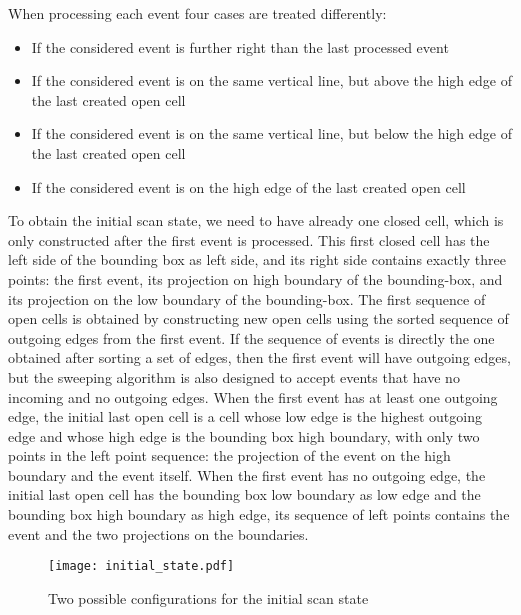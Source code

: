 \documentclass[a4paper, USenglish, cleveref, autoref, thm-restate]{lipics-v2021}
\begin{document}
When processing each event four cases are treated differently:
\begin{itemize}
\item If the considered event is further right than the last processed event
\item If the considered event is on the same vertical line, but above the
high edge of the last created open cell
\item If the considered event is on the same vertical line, but below the
high edge of the last created open cell
\item If the considered event is on the high edge of the last created open cell
\end{itemize}

To obtain the initial scan state, we need to have already one closed
cell, which is only constructed after the first event is processed.
This first closed cell has the left side of the bounding box as left
side, and its right side contains exactly three points: the first
event, its projection on high boundary of the bounding-box, and its
projection on the low boundary of the bounding-box.  The first
sequence of open cells is obtained by constructing new open cells
using the sorted sequence of outgoing edges from the first event.  If
the sequence of events is directly the one obtained after sorting a
set of edges, then the first event will have outgoing edges, but the
sweeping algorithm is also designed to accept events that have no
incoming and no outgoing edges.  When the first event has at least
one outgoing edge, the initial last open cell is a cell whose low edge
is the highest outgoing edge and whose high edge is the bounding box
high boundary, with only two points in the left point sequence: the
projection of the event on the high boundary and the event itself.
When the first event has no outgoing edge, the initial last open cell
has the bounding box low boundary as low edge and the bounding box
high boundary as high edge, its sequence of left points contains the
event and the two projections on the boundaries.
\begin{figure}
\texttt{[image: initial\_state.pdf]}
\caption{Two possible configurations for the initial scan state}
\end{figure}
\end{document}
